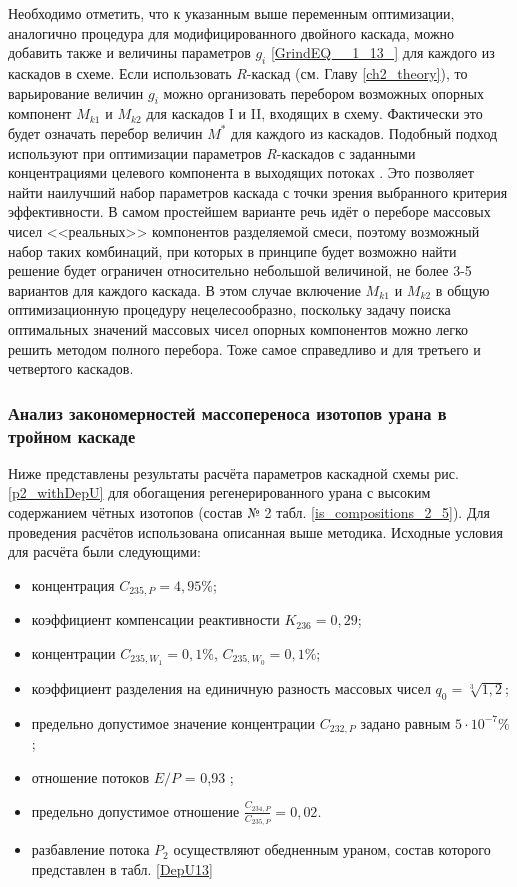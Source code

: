 {Необходимо отметить, что к указанным выше переменным оптимизации, аналогично процедура для модифицированного двойного каскада, можно добавить также и величины параметров $g_{i}$ \ref{GrindEQ__1_13_} для каждого из каскадов в схеме. Если использовать $R$-каскад (см. Главу \ref{ch2_theory}), то варьирование величин $g_{i}$ можно организовать перебором возможных опорных компонент $M_{k1}$ и $M_{k2}$ для каскадов I и II, входящих в схему. Фактически это будет означать перебор величин $M^{*}$ для каждого из каскадов. Подобный подход используют при оптимизации параметров $R$-каскадов с заданными концентрациями целевого компонента в выходящих потоках \cite{songComparativeStudyModel2010, sulaberidzeSravnenieOptimalnyhModelnyh2008}. Это позволяет найти наилучший набор параметров каскада с точки зрения выбранного критерия эффективности. В самом простейшем варианте речь идёт о переборе массовых чисел <<реальных>> компонентов разделяемой смеси, поэтому возможный набор таких комбинаций, при которых в принципе будет возможно найти решение будет ограничен относительно небольшой величиной, не более 3-5 вариантов для каждого каскада. В этом случае включение $M_{k1}$ и $M_{k2}$ в общую оптимизационную процедуру нецелесообразно, поскольку задачу поиска оптимальных значений массовых чисел опорных компонентов можно легко решить методом полного перебора. Тоже самое справедливо и для третьего и четвертого каскадов.


\subsubsection{Анализ закономерностей массопереноса изотопов урана в тройном  каскаде}

Ниже представлены результаты расчёта параметров каскадной схемы рис. \ref{p2_withDepU} для обогащения регенерированного урана с высоким содержанием чётных изотопов (состав № 2 табл. \ref{is_compositions_2_5}). Для проведения расчётов использована описанная выше методика. Исходные условия для расчёта были следующими:

\begin{itemize}
    \item концентрация $C_{235,{P}} = {4,95\%}$; 
    \item коэффициент компенсации реактивности $K_{236}=0,29$;
    \item концентрации $C_{235,{W_1}} = 0,1\%$, $C_{235,{W_0}} = 0,1\%$;
    \item коэффициент разделения на единичную разность массовых чисел $q_{0} = \sqrt[3]{1,2}$;
    \item предельно допустимое значение концентрации $C_{232,{P}}$ задано равным $5\cdot10^{-7} \%$;
    \item отношение потоков $E/P$ = 0,93 ;
    \item предельно допустимое отношение $\frac{C_{234,{P}}}{C_{235,{P}}} = 0,02$.
    \item разбавление потока $P_2$ осуществляют обедненным ураном, состав которого представлен в табл. \ref{DepU13}
\end{itemize}

}
